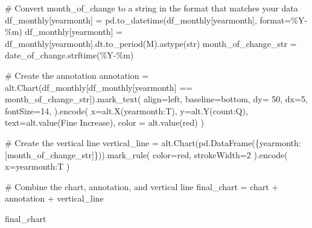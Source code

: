 \documentclass[
  letterpaper,
  DIV=11,
  numbers=noendperiod]{scrartcl}
\newenvironment{Shaded}{\begin{snugshade}}{\end{snugshade}}
\newcommand{\BuiltInTok}[1]{\textcolor[rgb]{0.00,0.23,0.31}{#1}}
\newcommand{\CommentTok}[1]{\textcolor[rgb]{0.37,0.37,0.37}{#1}}
\newcommand{\DecValTok}[1]{\textcolor[rgb]{0.68,0.00,0.00}{#1}}
\newcommand{\NormalTok}[1]{\textcolor[rgb]{0.00,0.23,0.31}{#1}}
\newcommand{\OperatorTok}[1]{\textcolor[rgb]{0.37,0.37,0.37}{#1}}
\newcommand{\StringTok}[1]{\textcolor[rgb]{0.13,0.47,0.30}{#1}}
\begin{document}
\begin{Shaded}
\begin{Highlighting}[]
\CommentTok{\# Convert month\_of\_change to a string in the format that matches your data}
\NormalTok{df\_monthly[}\StringTok{\textquotesingle{}yearmonth\textquotesingle{}}\NormalTok{] }\OperatorTok{=}\NormalTok{ pd.to\_datetime(df\_monthly[}\StringTok{\textquotesingle{}yearmonth\textquotesingle{}}\NormalTok{], }\BuiltInTok{format}\OperatorTok{=}\StringTok{\textquotesingle{}\%Y{-}\%m\textquotesingle{}}\NormalTok{)}
\NormalTok{df\_monthly[}\StringTok{\textquotesingle{}yearmonth\textquotesingle{}}\NormalTok{] }\OperatorTok{=}\NormalTok{ df\_monthly[}\StringTok{\textquotesingle{}yearmonth\textquotesingle{}}\NormalTok{].dt.to\_period(}\StringTok{\textquotesingle{}M\textquotesingle{}}\NormalTok{).astype(}\BuiltInTok{str}\NormalTok{)}
\NormalTok{month\_of\_change\_str }\OperatorTok{=}\NormalTok{ date\_of\_change.strftime(}\StringTok{\textquotesingle{}\%Y{-}\%m\textquotesingle{}}\NormalTok{)}

\CommentTok{\# Create the annotation}
\NormalTok{annotation }\OperatorTok{=}\NormalTok{ alt.Chart(df\_monthly[df\_monthly[}\StringTok{\textquotesingle{}yearmonth\textquotesingle{}}\NormalTok{] }\OperatorTok{==}\NormalTok{ month\_of\_change\_str]).mark\_text(}
\NormalTok{    align}\OperatorTok{=}\StringTok{\textquotesingle{}left\textquotesingle{}}\NormalTok{,}
\NormalTok{    baseline}\OperatorTok{=}\StringTok{\textquotesingle{}bottom\textquotesingle{}}\NormalTok{,}
\NormalTok{    dy}\OperatorTok{=} \DecValTok{50}\NormalTok{, }
\NormalTok{    dx}\OperatorTok{=}\DecValTok{5}\NormalTok{,}
\NormalTok{    fontSize}\OperatorTok{=}\DecValTok{14}\NormalTok{,}
\NormalTok{).encode(}
\NormalTok{    x}\OperatorTok{=}\NormalTok{alt.X(}\StringTok{\textquotesingle{}yearmonth:T\textquotesingle{}}\NormalTok{),}
\NormalTok{    y}\OperatorTok{=}\NormalTok{alt.Y(}\StringTok{\textquotesingle{}count:Q\textquotesingle{}}\NormalTok{),}
\NormalTok{    text}\OperatorTok{=}\NormalTok{alt.value(}\StringTok{\textquotesingle{}Fine Increase\textquotesingle{}}\NormalTok{),}
\NormalTok{    color }\OperatorTok{=}\NormalTok{ alt.value(}\StringTok{\textquotesingle{}red\textquotesingle{}}\NormalTok{)}
\NormalTok{)}

\CommentTok{\# Create the vertical line}
\NormalTok{vertical\_line }\OperatorTok{=}\NormalTok{ alt.Chart(pd.DataFrame(\{}\StringTok{\textquotesingle{}yearmonth\textquotesingle{}}\NormalTok{: [month\_of\_change\_str]\})).mark\_rule(}
\NormalTok{    color}\OperatorTok{=}\StringTok{\textquotesingle{}red\textquotesingle{}}\NormalTok{,}
\NormalTok{    strokeWidth}\OperatorTok{=}\DecValTok{2}
\NormalTok{).encode(}
\NormalTok{    x}\OperatorTok{=}\StringTok{\textquotesingle{}yearmonth:T\textquotesingle{}}
\NormalTok{)}

\CommentTok{\# Combine the chart, annotation, and vertical line}
\NormalTok{final\_chart }\OperatorTok{=}\NormalTok{ chart }\OperatorTok{+}\NormalTok{ annotation }\OperatorTok{+}\NormalTok{ vertical\_line}

\NormalTok{final\_chart}
\end{Highlighting}
\end{Shaded}
\end{document}
